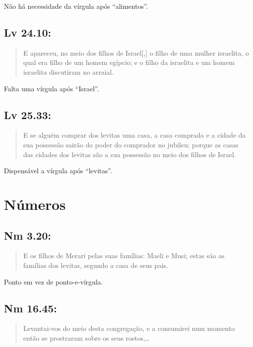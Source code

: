 Não há necessidade da vírgula após ``alimentos''.

\subsection*{Lv 24.10:} 
\begin{quote}
    \small
E apareceu, no meio dos filhos de Israel[,] o filho de uma mulher israelita, o qual era filho de um homem egípcio; e o filho da israelita e um homem israelita discutiram no arraial.
\end{quote}

Falta uma vírgula após ``Israel''.

\subsection*{Lv 25.33:} 
\begin{quote}
    \small
E se alguém comprar dos levitas\uwave{,} uma casa, a casa comprada e a cidade da sua possessão sairão do poder do comprador no jubileu; porque as casas das cidades dos levitas são a sua possessão no meio dos filhos de Israel.
\end{quote}

Dispensável a vírgula após ``levitas''.

\section{Números}
\subsection*{Nm 3.20:} 
\begin{quote}
    \small
E os filhos de Merari pelas suas famílias: Maeli e Musi\uline{;} estas são as famílias dos levitas, segundo a casa de seus pais.
\end{quote}

Ponto em vez de ponto-e-vírgula.


\subsection*{Nm 16.45:} 
\begin{quote}
    \small
Levantai-vos do meio desta congregação, e a consumirei num momento\uwave{;} então se prostraram sobre os seus rostos,\ldots
\end{quote}

